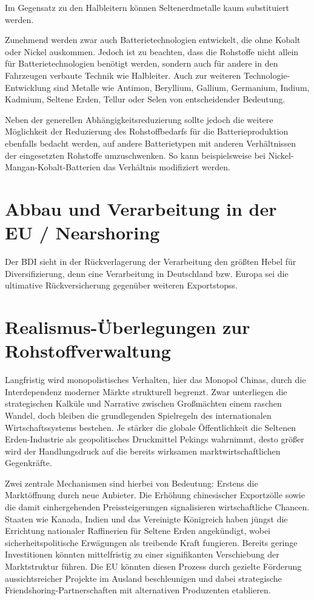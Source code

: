 \documentclass[12pt,a4paper,oneside]{book} %
\begin{document}
Im Gegensatz zu den Halbleitern können Seltenerdmetalle kaum substituiert werden.

Zunehmend werden zwar auch Batterietechnologien entwickelt, die ohne Kobalt oder Nickel auskommen. Jedoch ist zu beachten, dass die Rohstoffe nicht allein für Batterietechnologien benötigt werden, sondern auch für andere in den Fahrzeugen verbaute Technik wie Halbleiter. Auch zur weiteren Technologie-Entwicklung sind Metalle wie Antimon, Beryllium, Gallium, Germanium, Indium, Kadmium, Seltene Erden, Tellur oder Selen von entscheidender Bedeutung.\autocite{Commodity Top News 73, S. 3}

Neben der generellen Abhängigkeitsreduzierung sollte jedoch die weitere Möglichkeit der Reduzierung des Rohstoffbedarfs für die Batterieproduktion ebenfalls bedacht werden, auf andere Batterietypen mit anderen Verhältnissen der eingesetzten Rohstoffe umzuschwenken. So kann beispielsweise bei Nickel-Mangan-Kobalt-Batterien das Verhältnis modifiziert werden.

\section{Abbau und Verarbeitung in der EU / Nearshoring}

Der BDI sieht in der Rückverlagerung der Verarbeitung den \glqq größten Hebel für Diversifizierung\glqq, denn eine Verarbeitung in Deutschland bzw. Europa sei \glqq die ultimative Rückversicherung gegenüber weiteren Exportstopss\glqq.\autocite{Stefan Steinicke, BDI, 06.05.2025}

\section{Realismus-Überlegungen zur Rohstoffverwaltung}

Langfristig wird monopolistisches Verhalten, hier das Monopol Chinas, durch die Interdependenz moderner Märkte strukturell begrenzt. Zwar unterliegen die strategischen Kalküle und Narrative zwischen Großmächten einem raschen Wandel, doch bleiben die grundlegenden Spielregeln des internationalen Wirtschaftssystems bestehen. Je stärker die globale Öffentlichkeit die Seltenen Erden-Industrie als geopolitisches Druckmittel Pekings wahrnimmt, desto größer wird der Handlungsdruck auf die bereits wirksamen marktwirtschaftlichen Gegenkräfte.

Zwei zentrale Mechanismen sind hierbei von Bedeutung: Erstens die Marktöffnung durch neue Anbieter. Die Erhöhung chinesischer Exportzölle sowie die damit einhergehenden Preissteigerungen signalisieren wirtschaftliche Chancen. Staaten wie Kanada, Indien und das Vereinigte Königreich haben jüngst die Errichtung nationaler Raffinerien für Seltene Erden angekündigt, wobei sicherheitspolitische Erwägungen als treibende Kraft fungieren. Bereits geringe Investitionen könnten mittelfristig zu einer signifikanten Verschiebung der Marktstruktur führen. Die EU könnten diesen Prozess durch gezielte Förderung aussichtsreicher Projekte im Ausland beschleunigen und dabei strategische Friendshoring-Partnerschaften mit alternativen Produzenten etablieren.
\end{document}
